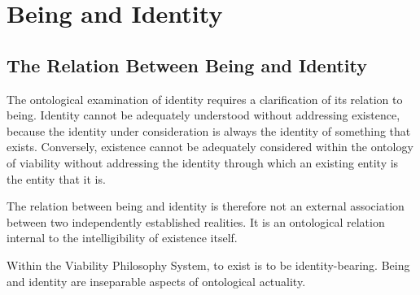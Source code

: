 
%
%
%
%
%
%
%
%
%
%
%
%


\section{Being and Identity}
\label{sec:being-and-identity}



\subsection{The Relation Between Being and Identity}
\label{subsec:relation-between-being-and-identity}

The ontological examination of identity requires a
clarification of its relation to being. Identity cannot
be adequately understood without addressing existence,
because the identity under consideration is always
the identity of something that exists. Conversely,
existence cannot be adequately considered within the
ontology of viability without addressing the identity
through which an existing entity is the entity that
it is.

The relation between being and identity is therefore
not an external association between two independently
established realities. It is an ontological relation
internal to the intelligibility of existence itself.

Within the Viability Philosophy System, to exist is
to be identity-bearing. Being and identity are
inseparable aspects of ontological actuality.


